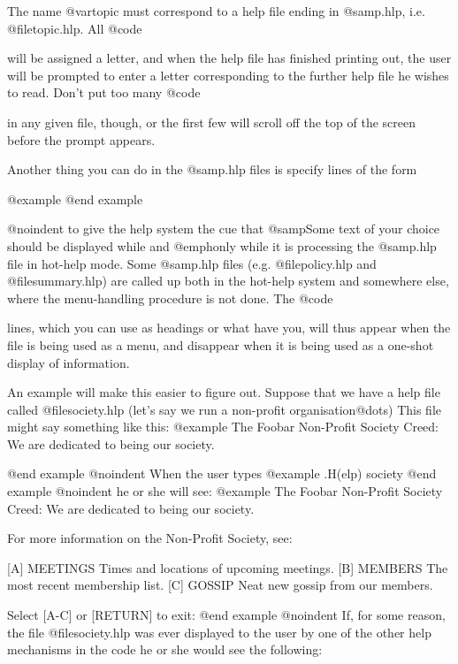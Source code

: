 The name @var{topic} must correspond to a help file ending in @samp{.hlp},
i.e. @file{topic.hlp}.  All @code{%
will be assigned a letter, and when the help file has finished printing
out, the user will be prompted to enter a letter corresponding to
the further help file he wishes to read.  Don't put too many @code{%
in any given file, though, or the first few will scroll off the top
of the screen before the prompt appears.
 
Another thing you can do in the @samp{.hlp} files is specify
lines of the form

@example
@end example

@noindent
to give the help system the cue that @samp{Some text of your choice}
should be displayed while and @emph{only} while it is processing the
@samp{.hlp} file in hot-help mode.  Some @samp{.hlp} files (e.g. @file{policy.hlp} and
@file{summary.hlp}) are called up both in the hot-help system and somewhere
else, where the menu-handling procedure is not done.  The @code{%
lines, which you can use as headings or what have you, will thus
appear when the file is being used as a menu, and disappear when it
is being used as a one-shot display of information.

An example will make this easier to figure out.  Suppose
that we have a help file called @file{society.hlp} (let's say we run a
non-profit organisation@dots{})  This file might say something like
this:
@example
The Foobar Non-Profit Society Creed:
We are dedicated to being our society.


@end example
@noindent
When the user types
@example
.H(elp) society
@end example
@noindent
he or she will see:
@example
The Foobar Non-Profit Society Creed:
We are dedicated to being our society.

For more information on the Non-Profit Society, see:

[A] MEETINGS    Times and locations of upcoming meetings.
[B] MEMBERS     The most recent membership list.
[C] GOSSIP      Neat new gossip from our members.

Select [A-C] or [RETURN] to exit:
@end example
@noindent
If, for some reason, the file @file{society.hlp} was ever
displayed to the user by one of the other help mechanisms in the code
he or she would see the following:

}}}
